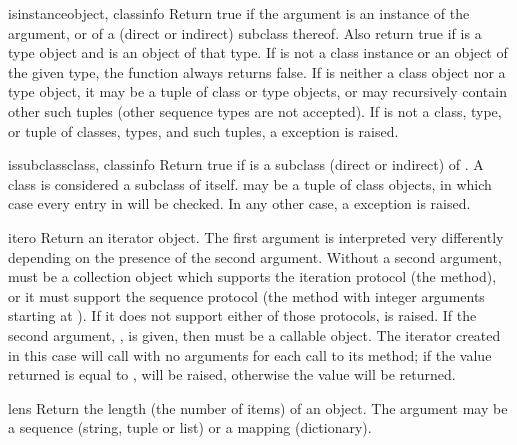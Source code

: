 \begin{funcdesc}{isinstance}{object, classinfo}
  Return true if the  argument is an instance of the
   argument, or of a (direct or indirect) subclass
  thereof.  Also return true if  is a type object and
   is an object of that type.  If  is not a
  class instance or an object of the given type, the function always
  returns false.  If  is neither a class object nor a
  type object, it may be a tuple of class or type objects, or may
  recursively contain other such tuples (other sequence types are not
  accepted).  If  is not a class, type, or tuple of
  classes, types, and such tuples, a  exception
  is raised.
\end{funcdesc}

\begin{funcdesc}{issubclass}{class, classinfo}
  Return true if  is a subclass (direct or indirect) of
  .  A class is considered a subclass of itself.
   may be a tuple of class objects, in which case every
  entry in  will be checked. In any other case, a
   exception is raised.
\end{funcdesc}

\begin{funcdesc}{iter}{o}
  Return an iterator object.  The first argument is interpreted very
  differently depending on the presence of the second argument.
  Without a second argument,  must be a collection object which
  supports the iteration protocol (the  method), or
  it must support the sequence protocol (the 
  method with integer arguments starting at ).  If it does not
  support either of those protocols,  is raised.
  If the second argument, , is given, then  must
  be a callable object.  The iterator created in this case will call
   with no arguments for each call to its 
  method; if the value returned is equal to ,
   will be raised, otherwise the value will
  be returned.
\end{funcdesc}

\begin{funcdesc}{len}{s}
  Return the length (the number of items) of an object.  The argument
  may be a sequence (string, tuple or list) or a mapping (dictionary).
\end{funcdesc}

